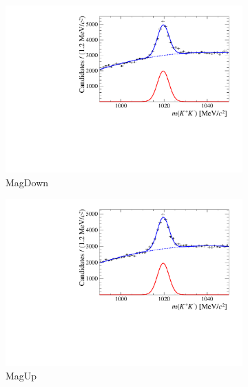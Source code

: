 \begin{figure}[!h]
   \centering
   \begin{subfigure}[t]{0.4\textwidth}
      \centering
      \includegraphics[width=1.0\textwidth]{figs/Selection/Fit_Data_Bs2JpsiPhi_Jpsi2MuMu_Phi2KK_2016_MagDown.pdf}
      \caption{\decay{\phiz}{\Kp\Km} MagDown}
   \end{subfigure}
   \begin{subfigure}[t]{0.4\textwidth}
      \centering
      \includegraphics[width=1.0\textwidth]{figs/Selection/Fit_Data_Bs2JpsiPhi_Jpsi2MuMu_Phi2KK_2016_MagUp.pdf}
      \caption{\decay{\phiz}{\Kp\Km} MagUp}
   \end{subfigure}\\
   \begin{subfigure}[t]{0.4\textwidth}

\end{subfigure}
\end{figure}
